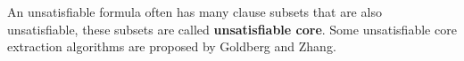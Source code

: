 \documentclass[journal]{IEEEtran}
\begin{document}
An unsatisfiable formula often has many clause subsets that are also unsatisfiable,
these subsets are called \textbf{unsatisfiable core}.
Some unsatisfiable core extraction algorithms are proposed by Goldberg\cite{VERPROOF} and Zhang\cite{VALIDSAT}.

%
%
%
\end{document}
